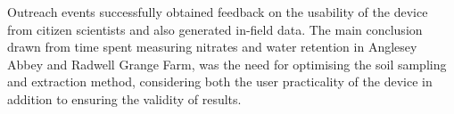    
    
    Outreach %
    events successfully obtained feedback on the usability of the device from citizen scientists and also generated in-field data. The main conclusion drawn from %
    time spent measuring nitrates and water retention in Anglesey Abbey and Radwell Grange Farm, was the need for optimising the soil sampling and extraction method, considering both the user practicality of the device in addition to ensuring the validity of results. 
    
